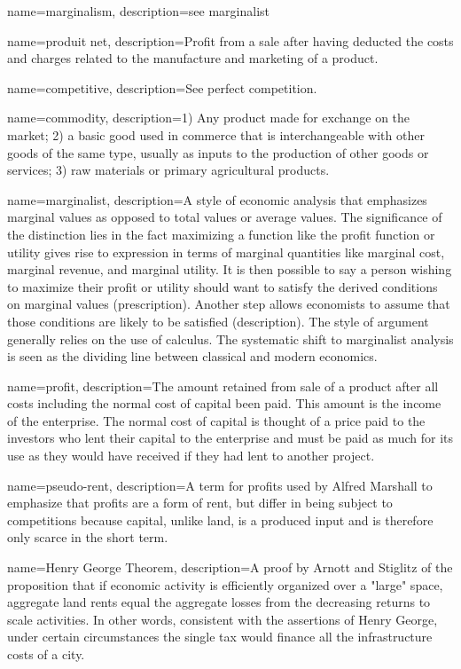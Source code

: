 {
name=marginalism,
description={see \gls{marginalist}}
}

{
name=produit net,
description={Profit from a sale after having deducted the costs and charges related to the manufacture and marketing of a product.}
}

{
name=competitive,
description={See \gls{perfect competition}.}
}

{
name=commodity,
description={1) Any product  made for exchange on the market; 2) a basic good used in commerce that is interchangeable with other goods of the same type, usually  as inputs to the production of other goods or services; 3) raw materials or primary agricultural products.}
}

{
name=marginalist,
description={A style of economic analysis that emphasizes marginal values as opposed to total values or average values. The significance of the distinction lies in the fact maximizing a function like the profit function or utility gives rise to expression in terms of marginal quantities like marginal cost, marginal revenue, and marginal utility. It is then possible to say a person wishing to maximize their profit or utility should want to satisfy the derived conditions on marginal values (prescription). Another step allows economists to assume that those conditions are likely to be satisfied (description). The style of argument generally relies on the use of calculus. The systematic shift to marginalist analysis is seen as the dividing line between classical and modern economics.}
}

{
name=profit,
description={The amount retained from sale of a product after all costs including the normal cost of capital  been paid. This amount is the income of the enterprise. The normal cost of capital is thought of a price paid to the investors who lent their capital to the enterprise and must be paid as  much for its use as they would have received if they had lent to another project. }
}



{
name=pseudo-rent,
description={A term for profits used by Alfred Marshall to emphasize that profits are a form of rent, but differ in being subject to competitions because capital, unlike land, is a produced input and is therefore only scarce in the short term. }
}

{
name=Henry George Theorem,
description={A proof by Arnott and Stiglitz \cite{arnottAggregateLandRents1979} of the proposition that if economic activity is efficiently organized over a "large" space, aggregate land rents equal the aggregate losses from the decreasing returns to scale activities. In other words, consistent with the assertions of Henry George, under certain circumstances the \gls{single tax} would finance all the infrastructure costs of a city. }
}

